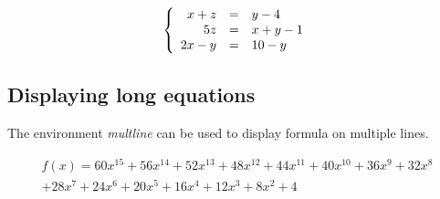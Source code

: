 \documentclass{article}
\begin{document}
\[
\left\{
\begin{array}{ r c l}
		x + z &=& y - 4 \\
		5z &=& x + y -1 \\
		2x - y &=& 10 - y
\end{array}
\right.
\]

\subsection*{Displaying long equations}

The environment \emph{multline} can be used to display formula on multiple lines.

\begin{multline*}
	f(x) = 60x^{15} + 56x^{14} + 52x^{13} + 48x^{12} + 44x^{11} + 40x^{10} + 36x^{9} + 32x^{8}\\
	+ 28x^{7} + 24x^{6} + 20x^{5} + 16x^{4} + 12x^{3} + 8x^{2} + 4
\end{multline*}
\end{document}
